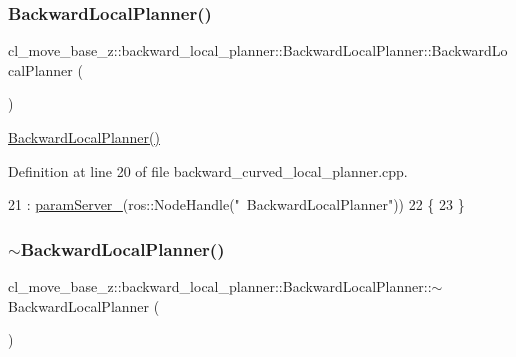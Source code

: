 \subsubsection{\texorpdfstring{Backward\+Local\+Planner()}{BackwardLocalPlanner()}}
{\footnotesize\ttfamily cl\+\_\+move\+\_\+base\+\_\+z\+::backward\+\_\+local\+\_\+planner\+::\+Backward\+Local\+Planner\+::\+Backward\+Local\+Planner (\begin{DoxyParamCaption}{ }\end{DoxyParamCaption})}

\hyperlink{classcl__move__base__z_1_1backward__local__planner_1_1BackwardLocalPlanner_a79e73a858b2a13c7fe10c52e08568fd6}{Backward\+Local\+Planner()} 

Definition at line 20 of file backward\+\_\+curved\+\_\+local\+\_\+planner.\+cpp.


\begin{DoxyCode}
21             : \hyperlink{classcl__move__base__z_1_1backward__local__planner_1_1BackwardLocalPlanner_afb349461ce9c4edee018dbb822a8cd9a}{paramServer\_}(ros::NodeHandle(\textcolor{stringliteral}{"~BackwardLocalPlanner"}))
22         \{
23         \}
\end{DoxyCode}
\mbox{\label{classcl__move__base__z_1_1backward__local__planner_1_1BackwardLocalPlanner_a6a36aa94617786c6958e861e64abb862}} 
\subsubsection{\texorpdfstring{$\sim$\+Backward\+Local\+Planner()}{~BackwardLocalPlanner()}}
{\footnotesize\ttfamily cl\+\_\+move\+\_\+base\+\_\+z\+::backward\+\_\+local\+\_\+planner\+::\+Backward\+Local\+Planner\+::$\sim$\+Backward\+Local\+Planner (\begin{DoxyParamCaption}{ }\end{DoxyParamCaption})\hspace{0.3cm}{\ttfamily [virtual]}}

